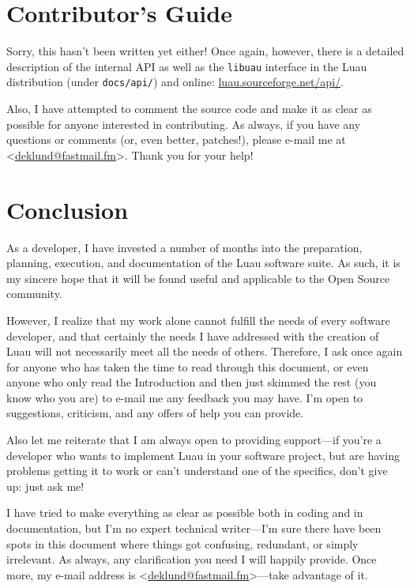\documentclass{report}
\begin{document}
\chapter{Contributor's Guide}

Sorry, this hasn't been written yet either!  Once again, however, there is a detailed description of the internal API as well as the \texttt{libuau} interface in the Luau distribution (under \texttt{docs/api/}) and online: \href{http://luau.sourceforge.net/api/}{luau.sourceforge.net/api/}.

Also, I have attempted to comment the source code and make it as clear as possible for anyone interested in contributing.  As always, if you have any questions or comments (or, even better, patches!), please e-mail me at <\href{mailto:deklund@fastmail.fm}{deklund@fastmail.fm}>.  Thank you for your help!

\chapter{Conclusion}

As a developer, I have invested a number of months into the preparation, planning, execution, and documentation of the Luau software suite.  As such, it is my sincere hope that it will be found useful and applicable to the Open Source community.

However, I realize that my work alone cannot fulfill the needs of every software developer, and that certainly the needs I have addressed with the creation of Luau will not necessarily meet all the needs of others.  Therefore, I ask once again for anyone who has taken the time to read through this document, or even anyone who only read the Introduction and then just skimmed the rest (you know who you are) to e-mail me any feedback you may have.  I'm open to suggestions, criticism, and any offers of help you can provide.

Also let me reiterate that I am always open to providing support---if you're a developer who wants to implement Luau in your software project, but are having problems getting it to work or can't understand one of the specifics, don't give up: just ask me!

I have tried to make everything as clear as possible both in coding and in documentation, but I'm no expert technical writer---I'm sure there have been spots in this document where things got confusing, redundant, or simply irrelevant.  As always, any clarification you need I will happily provide.  Once more, my e-mail address is <\href{mailto:deklund@fastmail.fm}{deklund@fastmail.fm}>---take advantage of it.
\end{document}
